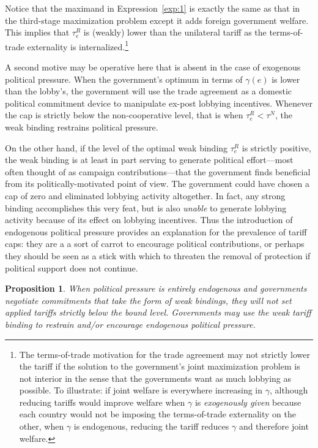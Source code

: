 \documentclass[12pt]{article}
\newtheorem{proposition}{Proposition}
\newcommand{\ga}{\gamma}
\begin{document}
Notice that the maximand in Expression~\ref{exp:1} is exactly the same as that in the third-stage maximization problem except it adds  foreign government welfare. This implies that $\tau_e^R$ is (weakly) lower than the unilateral tariff as the terms-of-trade externality is internalized.\footnote{The terms-of-trade motivation for the trade agreement may not strictly lower the tariff if the solution to the government's joint maximization problem is not interior in the sense that the governments want as much lobbying as possible. To illustrate: if joint welfare is everywhere increasing in $\ga$, although reducing tariffs would improve welfare when $\ga$ is \textit{exogenously given} because each country would not be imposing the terms-of-trade externality on the other, when $\ga$ is endogenous, reducing the tariff reduces $\ga$ and therefore joint welfare.\label{fn:tot}}

A second motive may be operative here that is absent in the case of exogenous political pressure. When the government's optimum in terms of $\ga(e)$ is lower than the lobby's, the government will use the trade agreement as a domestic political commitment device to manipulate ex-post lobbying incentives. Whenever the cap is strictly below the non-cooperative level, that is when $\tau_e^R < \tau^N$, the weak binding restrains political pressure.

On the other hand, if the level of the optimal weak binding $\tau_e^R$ is strictly positive, the weak binding is at least in part serving to generate political effort---most often thought of as campaign contributions---that the government finds beneficial from its politically-motivated point of view. The government could have chosen a cap of zero and eliminated lobbying activity altogether. In fact, any strong binding accomplishes this very feat, but is also \textit{unable} to generate lobbying activity because of its effect on lobbying incentives. Thus the introduction of endogenous political pressure provides an explanation for the prevalence of tariff caps: they are a a sort of carrot to encourage political contributions, or perhaps they should be seen as a stick with which to threaten the removal of protection if political support does not continue.

\begin{proposition}
    When political pressure is entirely endogenous and governments negotiate commitments that take the form of weak bindings, they will not set applied tariffs strictly below the bound level. Governments may use the weak tariff binding to restrain and/or encourage endogenous political pressure.
		\label{res:weak}
\end{proposition}
\end{document}
